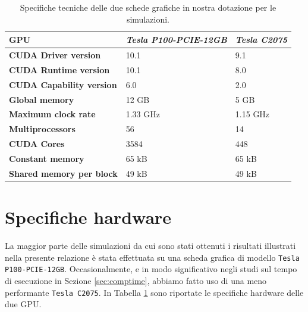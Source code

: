 \begin{table}[t]
\small
\centering
\begin{tabular}{|l||l|l|}
\hline
\textbf{GPU} & \textit{Tesla P100-PCIE-12GB} & \textit{Tesla C2075} \\
\hline \hline
\textbf{CUDA Driver version} & 10.1 & 9.1 \\ \hline
\textbf{CUDA Runtime version} & 10.1 & 8.0 \\ \hline
\textbf{CUDA Capability version} & 6.0 & 2.0 \\ \hline
\textbf{Global memory} & 12 GB &  5 GB \\ \hline
\textbf{Maximum clock rate} & 1.33 GHz & 1.15 GHz \\ \hline
\textbf{Multiprocessors} & 56 & 14 \\ \hline
\textbf{CUDA Cores} & 3584 & 448 \\ \hline
\textbf{Constant memory} & 65 kB & 65 kB \\ \hline
\textbf{Shared memory per block} & 49 kB & 49 kB \\
\hline
\end{tabular}
\caption{Specifiche tecniche delle due schede grafiche in nostra dotazione per le simulazioni.}
\label{tab:hardware}
\end{table}

\section{Specifiche hardware} \label{sec:hardware}
La maggior parte delle simulazioni da cui sono stati ottenuti i risultati illustrati nella presente relazione è stata effettuata su una scheda grafica di modello \verb|Tesla P100-PCIE-12GB|. Occasionalmente, e in modo significativo negli studi sul tempo di esecuzione in Sezione \ref{sec:comptime}, abbiamo fatto uso di una meno performante \verb|Tesla C2075|. In Tabella \ref{tab:hardware} sono riportate le specifiche hardware delle due GPU.